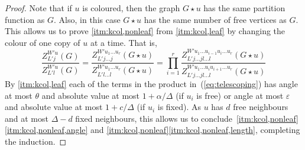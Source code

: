 \documentclass[10pt,a4paper]{article}
\theoremstyle{definition}
\newcommand*{\eps}{\varepsilon}
\begin{document}
\begin{proof}
Note that if $u$ is coloured, then the graph $G \star u$ has the same partition function as $G$.
Also, in this case $G \star u$ has the same number of free vertices as $G$.
This allows us to prove \ref{itm:kcol,nonleaf} from \ref{itm:kcol,leaf} by changing the colour of one copy of $u$ at a time.
That is,
\begin{equation}
 \frac{Z_{L'j}^{W'u}(G)}{Z_{L'l}^{W'u}(G)} = \frac{Z_{L'j\ldots j}^{W'u_1\ldots u_r}(G\star u )}{Z_{L'l\ldots l}^{W'u_1\ldots u_r}(G\star u )} = \prod_{i=1}^r \frac{Z_{L'j\ldots j l \ldots l}^{W'u_1\ldots u_{i-1}u_i \ldots u_r}(G\star u )}{Z_{L'j\ldots j l \ldots l}^{W'u_1\ldots u_i u_{i+1} \ldots u_r}(G\star u )} \label{eq:telescoping}
\end{equation}
By \ref{itm:kcol,leaf} each of the terms in the product in~(\ref{eq:telescoping}) has angle at most $\theta$ and absolute value at most $1 +\alpha/\Delta$ (if $u_i$ is free) or angle at most $\eps$ and absolute value at most $1 +c/\Delta$ (if $u_i$ is fixed).
As $u$ has $d$ free neighbours and at most $\Delta -d$ fixed neighbours, this allows us to conclude~\ref{itm:kcol,nonleaf}\ref{itm:kcol,nonleaf,angle} and \ref{itm:kcol,nonleaf}\ref{itm:kcol,nonleaf,length}, completing the induction.
\end{proof}
%
\end{document}
